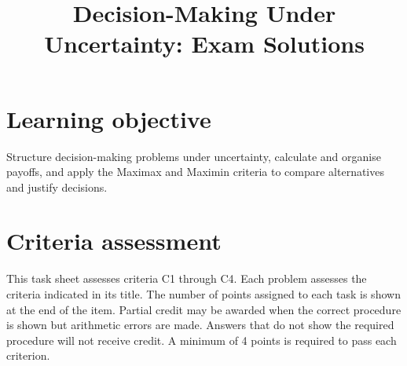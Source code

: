 \makeatletter
{}
\makeatother




\title{Decision-Making Under Uncertainty: Exam Solutions}
\author{}
\date{}


	\maketitle
	\vspace{-2cm}
	\setcounter{tocdepth}{1}
	\setcounter{secnumdepth}{2}
	\label{toc}
\label{sec:solutions-extraction}
	\tableofcontents
	
	\vspace{-5mm}
	\section*{Learning objective}\vspace{-5mm}
	Structure decision-making problems under uncertainty, calculate and organise payoffs, and apply the Maximax and Maximin criteria to compare alternatives and justify decisions.
	
	\section*{Criteria assessment}\vspace{-5mm}
	This task sheet assesses criteria C1 through C4. Each problem assesses the criteria indicated in its title. The number of points assigned to each task is shown at the end of the item. Partial credit may be awarded when the correct procedure is shown but arithmetic errors are made. Answers that do not show the required procedure will not receive credit. A minimum of 4 points is required to pass each criterion.
	
